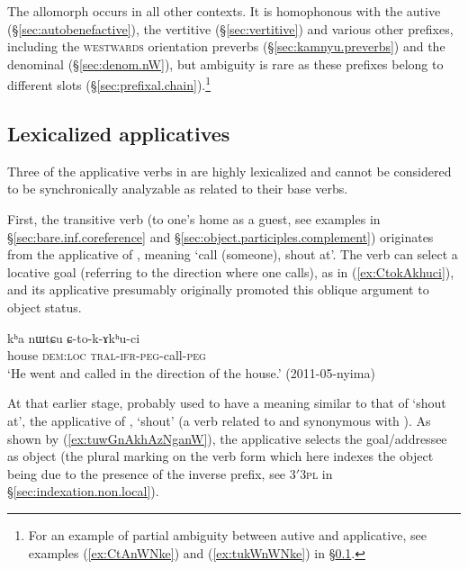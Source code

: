 The allomorph  occurs in all other contexts. It is homophonous with the autive (§\ref{sec:autobenefactive}), the vertitive (§\ref{sec:vertitive}) and various other prefixes, including the \textsc{westwards} orientation preverbs (§\ref{sec:kamnyu.preverbs}) and the denominal  (§\ref{sec:denom.nW}), but ambiguity is rare as these prefixes belong to different slots (§\ref{sec:prefixal.chain}).\footnote{For an example of partial ambiguity between autive and applicative, see examples (\ref{ex:CtAnWNke}) and (\ref{ex:tukWnWNke}) in §\ref{sec:applicative.lexicalized}. } 


\subsection{Lexicalized applicatives} \label{sec:applicative.lexicalized} 
Three of the applicative verbs in  are highly lexicalized and cannot be considered to be synchronically analyzable as related to their base verbs.
 
First, the transitive verb  (to one's home as a guest, see examples in §\ref{sec:bare.inf.coreference} and §\ref{sec:object.participles.complement}) originates from the applicative  of , meaning `call (someone), shout at'. The verb  can select a locative goal (referring to the direction where one calls), as in (\ref{ex:CtokAkhuci}), and its applicative  presumably originally promoted this oblique argument to object status.

\begin{exe}
\ex \label{ex:CtokAkhuci}
\gll kʰa nɯtɕu ɕ-to-k-ɤkʰu-ci \\
house \textsc{dem}:\textsc{loc} \textsc{tral}-\textsc{ifr}-\textsc{peg}-call-\textsc{peg} \\
\glt `He went and called in the direction of the house.' (2011-05-nyima)
\end{exe}

At that earlier stage,  probably used to have a meaning similar to that of  `shout at', the applicative of , `shout' (a verb related to and synonymous with ). As shown by (\ref{ex:tuwGnAkhAzNganW}), the applicative  selects the goal/addressee as object (the plural marking on the verb form which here indexes the object being due to the presence of the inverse prefix, see 3$'$\fl{}\textsc{3pl} in §\ref{sec:indexation.non.local}). 

